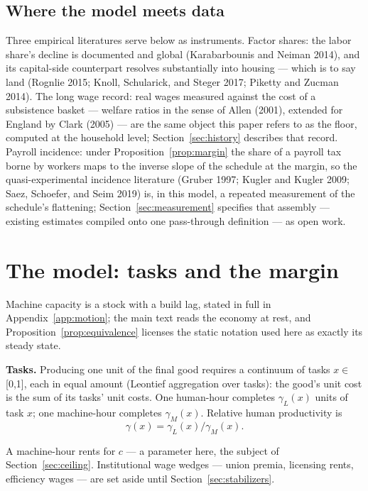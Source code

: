 \documentclass[12pt]{article}
\theoremstyle{plain}
\begin{document}
\subsection{Where the model meets data}\label{sec:data}

Three empirical literatures serve below as instruments. Factor shares: the labor share's decline is documented and global (Karabarbounis and Neiman 2014), and its capital-side counterpart resolves substantially into housing --- which is to say land (Rognlie 2015; Knoll, Schularick, and Steger 2017; Piketty and Zucman 2014). The long wage record: real wages measured against the cost of a subsistence basket --- welfare ratios in the sense of Allen (2001), extended for England by Clark (2005) --- are the same object this paper refers to as the floor, computed at the household level; Section~\ref{sec:history} describes that record. Payroll incidence: under Proposition~\ref{prop:margin} the share of a payroll tax borne by workers maps to the inverse slope of the schedule at the margin, so the quasi-experimental incidence literature (Gruber 1997; Kugler and Kugler 2009; Saez, Schoefer, and Seim 2019) is, in this model, a repeated measurement of the schedule's flattening; Section~\ref{sec:measurement} specifies that assembly --- existing estimates compiled onto one pass-through definition --- as open work.

\section{The model: tasks and the margin}\label{sec:model}

Machine capacity is a stock with a build lag, stated in full in Appendix~\ref{app:motion}; the main text reads the economy at rest, and Proposition~\ref{prop:equivalence} licenses the static notation used here as exactly its steady state.

\textbf{Tasks.} Producing one unit of the final good requires a continuum of tasks $x \in$ [0,1], each in equal amount (Leontief aggregation over tasks): the good's unit cost is the sum of its tasks' unit costs. One human-hour completes $\gamma _L(x)$ units of task $x$; one machine-hour completes $\gamma _M(x)$. Relative human productivity is
\begin{equation}\label{eq:gamma}
\gamma (x) = \gamma _L(x) / \gamma _M(x).
\end{equation}

A machine-hour rents for $c$ --- a parameter here, the subject of Section~\ref{sec:ceiling}. Institutional wage wedges --- union premia, licensing rents, efficiency wages --- are set aside until Section~\ref{sec:stabilizers}.
\end{document}
